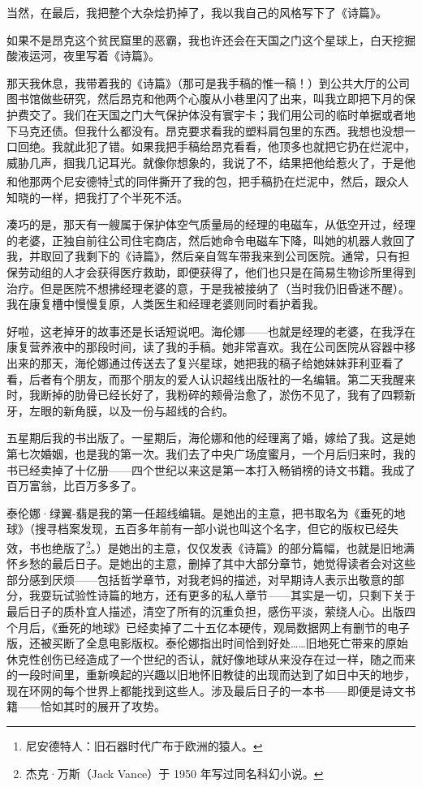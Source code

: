 \documentclass[AutoFakeBold=true]{book}
\begin{document}
当然，在最后，我把整个大杂烩扔掉了，我以我自己的风格写下了《诗篇》。

\vspace*{1em}

如果不是昂克这个贫民窟里的恶霸，我也许还会在天国之门这个星球上，白天挖掘酸液运河，夜里写着《诗篇》。

那天我休息，我带着我的《诗篇》（那可是我手稿的惟一稿！）到公共大厅的公司图书馆做些研究，然后昂克和他两个心腹从小巷里闪了出来，叫我立即把下月的保护费交了。我们在天国之门大气保护体没有寰宇卡；我们用公司的临时单据或者地下马克还债。但我什么都没有。昂克要求看我的塑料肩包里的东西。我想也没想一口回绝。我就此犯了错。如果我把手稿给昂克看看，他顶多也就把它扔在烂泥中，威胁几声，掴我几记耳光。就像你想象的，我说了不，结果把他给惹火了，于是他和他那两个尼安德特\footnote{尼安德特人：旧石器时代广布于欧洲的猿人。}式的同伴撕开了我的包，把手稿扔在烂泥中，然后，跟众人知晓的一样，把我打了个半死不活。

凑巧的是，那天有一艘属于保护体空气质量局的经理的电磁车，从低空开过，经理的老婆，正独自前往公司住宅商店，然后她命令电磁车下降，叫她的机器人救回了我，并取回了我剩下的《诗篇》，然后亲自驾车带我来到公司医院。通常，只有担保劳动组的人才会获得医疗救助，即便获得了，他们也只是在简易生物诊所里得到治疗。但是医院不想拂经理老婆的意，于是我被接纳了（当时我仍旧昏迷不醒）。我在康复槽中慢慢复原，人类医生和经理老婆则同时看护着我。

好啦，这老掉牙的故事还是长话短说吧。海伦娜——也就是经理的老婆，在我浮在康复营养液中的那段时间，读了我的手稿。她非常喜欢。我在公司医院从容器中移出来的那天，海伦娜通过传送去了复兴星球，她把我的稿子给她妹妹菲利亚看了看，后者有个朋友，而那个朋友的爱人认识超线出版社的一名编辑。第二天我醒来时，我断掉的肋骨已经长好了，我粉碎的颊骨治愈了，淤伤不见了，我有了四颗新牙，左眼的新角膜，以及一份与超线的合约。

五星期后我的书出版了。一星期后，海伦娜和他的经理离了婚，嫁给了我。这是她第七次婚姻，也是我的第一次。我们去了中央广场度蜜月，一个月后归来时，我的书已经卖掉了十亿册——四个世纪以来这是第一本打入畅销榜的诗文书籍。我成了百万富翁，比百万多多了。

泰伦娜·绿翼-翡是我的第一任超线编辑。是她出的主意，把书取名为《垂死的地球》（搜寻档案发现，五百多年前有一部小说也叫这个名字，但它的版权已经失效，书也绝版了\footnote{杰克·万斯（Jack Vance）于 1950 年写过同名科幻小说。}。）是她出的主意，仅仅发表《诗篇》的部分篇幅，也就是旧地满怀乡愁的最后日子。是她出的主意，删掉了其中大部分章节，她觉得读者会对这些部分感到厌烦——包括哲学章节，对我老妈的描述，对早期诗人表示出敬意的部分，我耍玩试验性诗篇的地方，还有更多的私人章节——其实是一切，只剩下关于最后日子的质朴宜人描述，清空了所有的沉重负担，感伤平淡，萦绕人心。出版四个月后，《垂死的地球》已经卖掉了二十五亿本硬传，观局数据网上有删节的电子版，还被买断了全息电影版权。泰伦娜指出时间恰到好处……旧地死亡带来的原始休克性创伤已经造成了一个世纪的否认，就好像地球从来没存在过一样，随之而来的一段时间里，重新唤起的兴趣以旧地怀旧教徒的出现而达到了如日中天的地步，现在环网的每个世界上都能找到这些人。涉及最后日子的一本书——即便是诗文书籍——恰如其时的展开了攻势。
\end{document}
